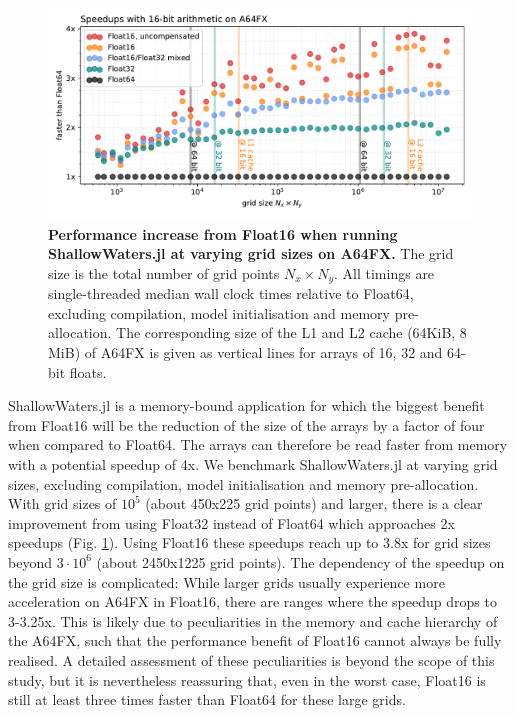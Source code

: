 \begin{figure}[tbhp]
	\includegraphics[width=1\textwidth]{Figures/a64fx/speedup.pdf}
	\caption{\textbf{Performance increase from Float16 when running ShallowWaters.jl at varying grid sizes
	on A64FX.} The grid size is the total number of grid points $N_x \times N_y$. All timings are single-threaded
	median wall clock times relative to Float64, excluding compilation, model initialisation and memory pre-allocation.
	The corresponding size of the L1 and L2 cache (64KiB, 8 MiB) of A64FX is given as vertical lines for arrays
	of 16, 32 and 64-bit floats.}
	\label{fig:a64fx_speedup}
\end{figure}

ShallowWaters.jl is a memory-bound application for which the biggest benefit from Float16 will be the reduction of
the size of the arrays by a factor of four when compared to Float64. The arrays can therefore be read faster from
memory with a potential speedup of 4x. We benchmark ShallowWaters.jl at varying grid sizes, excluding compilation,
model initialisation and memory pre-allocation. With grid sizes of $10^5$ (about 450x225 grid points) and larger,
there is a clear improvement from using Float32 instead of Float64 which approaches 2x speedups (Fig.
\ref{fig:a64fx_speedup}). Using Float16 these speedups reach up to 3.8x for grid sizes beyond $3 \cdot 10^6$
(about 2450x1225 grid points). The dependency of the speedup on the grid size is complicated:
While larger grids usually experience more acceleration on A64FX in Float16, there are ranges where the speedup
drops to 3-3.25x. This is likely due to peculiarities in the memory and cache hierarchy of the
A64FX, such that the performance benefit of Float16 cannot always be fully realised. A detailed assessment of these
peculiarities is beyond the scope of this study, but it is nevertheless reassuring that, even in the worst case, Float16
is still at least three times faster than Float64 for these large grids. 

